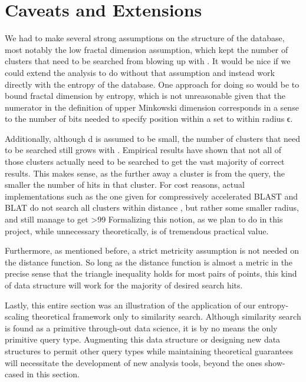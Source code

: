 \documentclass{amsbook}
\theoremstyle{definition}
\theoremstyle{remark}
\numberwithin{equation}{section}
\begin{document}
\section{Caveats and Extensions}

We had to make several strong assumptions on the structure of the database, most notably the low fractal dimension assumption, which kept the number of clusters that need to be searched from blowing up with .
It would be nice if we could extend the analysis to do without that assumption and instead work directly with the entropy of the database.
One approach for doing so would be to bound fractal dimension by entropy, which is not unreasonable given that the numerator in the definition of upper Minkowski dimension corresponds in a sense to the number of bits needed to specify position within a set to within radius ϵ.

Additionally, although d is assumed to be small, the number of clusters that need to be searched still grows with .
Empirical results have shown that not all of those clusters actually need to be searched to get the vast majority of correct results.
This makes sense, as the further away a cluster is from the query, the smaller the number of hits in that cluster.
For cost reasons, actual implementations such as the one given for compressively accelerated BLAST and BLAT do not search all clusters within distance , but rather some smaller radius, and still manage to get >99%
Formalizing this notion, as we plan to do in this project, while unnecessary theoretically, is of tremendous practical value.

Furthermore, as mentioned before, a strict metricity assumption is not needed on the distance function.
So long as the distance function is almost a metric in the precise sense that the triangle inequality holds for most pairs of points, this kind of data structure will work for the majority of desired search hits.

Lastly, this entire section was an illustration of the application of our entropy-scaling theoretical framework only to similarity search.
Although similarity search is found as a primitive through-out data science, it is by no means the only primitive query type.
Augmenting this data structure or designing new data structures to permit other query types while maintaining theoretical guarantees will necessitate the development of new analysis tools, beyond the ones show-cased in this section.
\end{document}
